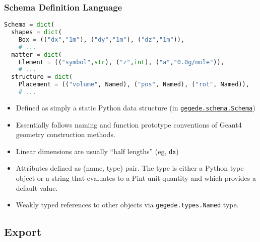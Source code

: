 \documentclass[10pt,xcolor=dvipsnames]{beamer}
\begin{document}
\begin{frame}[fragile]
  \frametitle{Schema Definition Language} 
  \begin{lstlisting}[language=Python]
Schema = dict(
  shapes = dict(
    Box = (("dx","1m"), ("dy","1m"), ("dz","1m")),
    # ...
  matter = dict(
    Element = (("symbol",str), ("z",int), ("a","0.0g/mole")),
    # ...
  structure = dict(
    Placement = (("volume", Named), ("pos", Named), ("rot", Named)),
    # ...
  \end{lstlisting}

  \footnotesize
  \begin{itemize}
  \item Defined as simply a static Python data structure (in \href{https://github.com/brettviren/gegede/blob/master/python/gegede/schema/__init__.py}{\texttt{gegede.schema.Schema}})
  \item Essentially follows naming and function prototype conventions of Geant4 geometry construction methods.
    
  \item Linear dimensions are usually ``half lengths'' (eg, \texttt{dx})
  \item Attributes defined as (name, type) pair.  The type is either a
    Python type object or a string that evaluates to a Pint unit
    quantity and which provides a default value.
    \item Weakly typed references to other objects via \texttt{gegede.types.Named} type.
  \end{itemize}
\end{frame}


\subsection{Export}
\end{document}
